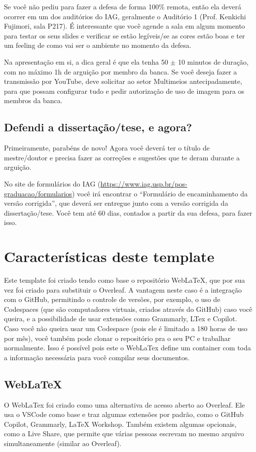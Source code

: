       Se você não pediu para fazer a defesa de forma 100\% remota, então ela deverá ocorrer em um dos auditórios do IAG, geralmente o Auditório 1 (Prof. Kenkichi Fujimori, sala P217). É interessante que você agende a sala em algum momento para testar os seus slides e verificar se estão legíveis/se as cores estão boas e ter um feeling de como vai ser o ambiente no momento da defesa.

      Na apresentação em si, a dica geral é que ela tenha 50 $\pm$ 10 minutos de duração, com no máximo 1h de arguição por membro da banca. Se você deseja fazer a transmissão por YouTube, deve solicitar ao setor Multimeios antecipadamente, para que possam configurar tudo e pedir autorização de uso de imagem para os membros da banca.

  \section{Defendi a dissertação/tese, e agora?}

    Primeiramente, parabéns de novo! Agora você deverá ter o título de mestre/doutor e precisa fazer as correções e sugestões que te deram durante a arguição.

    No site de formulários do IAG (\url{https://www.iag.usp.br/pos-graduacao/formularios}) você irá encontrar o ``Formulário de encaminhamento da versão corrigida'', que deverá ser entregue junto com a versão corrigida da dissertação/tese. Você tem até 60 dias, contados a partir da sua defesa, para fazer isso.

\chapter{Características deste template}
  Este template foi criado tendo como base o repositório Web\LaTeX{}, que por sua vez foi criado para substituir o Overleaf. A vantagem neste caso é a integração com o GitHub, permitindo o controle de versões, por exemplo, o uso de Codespaces (que são computadores virtuais, criados através do GitHub) caso você queira, e a possibilidade de usar extensões como Grammarly, LTex e Copilot. Caso você não queira usar um Codespace (pois ele é limitado a 180 horas de uso por mês), você também pode clonar o repositório pra o seu PC e trabalhar normalmente. Isso é possível pois este o WebLaTex define um container com toda a informação necessária para você compilar seus documentos.

  \section{Web\LaTeX{}}
    O WebLaTex foi criado como uma alternativa de acesso aberto ao Overleaf. Ele usa o VSCode como base e traz algumas extensões por padrão, como o GitHub Copilot, Grammarly, \LaTeX{} Workshop. Também existem algumas opcionais, como a Live Share, que permite que várias pessoas escrevam no mesmo arquivo simultaneamente (similar ao Overleaf).

